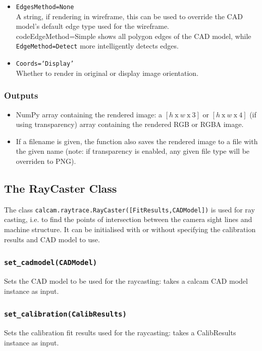 \documentclass[12pt]{article}
\newcommand{\code}[1]{\texttt{#1}}
\begin{document}
\begin{adjustwidth}{0.5cm}{0cm}
\begin{itemize}
\item{\code{EdgesMethod=None}\\A string, if rendering in wireframe, this can be used to override the CAD model's default edge type used for the wireframe. \\code{EdgeMethod=Simple} shows all polygon edges of the CAD model, while \code{EdgeMethod=Detect} more intelligently detects edges.}
\item{\code{Coords=`Display'}\\Whether to render in original or display image orientation.}
\end{itemize}
\subsubsection*{Outputs}
\begin{itemize}
\item{NumPy array containing the rendered image: a $[h\:\mathrm{x}\:w\:\mathrm{x}\:3]$ or $[h\:\mathrm{x}\:w\:\mathrm{x}\:4]$ (if using transparency) array containing the rendered RGB or RGBA image.}
\item{If a filename is given, the function also saves the rendered image to a file with the given name (note: if transparency is enabled, any given file type will be overriden to PNG).}
\end{itemize}
\end{adjustwidth}

\subsection{The RayCaster Class}
The class \code{calcam.raytrace.RayCaster([FitResults,CADModel])} is used for ray casting, i.e. to find the points of intersection between the camera sight lines and machine structure. It can be initialised with or without specifying the calibration results and CAD model to use.

\subsubsection*{\code{set\_cadmodel(CADModel)}}
\begin{adjustwidth}{0.5cm}{0cm}
Sets the CAD model to be used for the raycasting: takes a calcam CAD model instance as input.
\end{adjustwidth}

\subsubsection*{\code{set\_calibration(CalibResults)}}
\begin{adjustwidth}{0.5cm}{0cm}
Sets the calibration fit results used for the raycasting: takes a CalibResults instance as input.
\end{adjustwidth}
\end{document}
